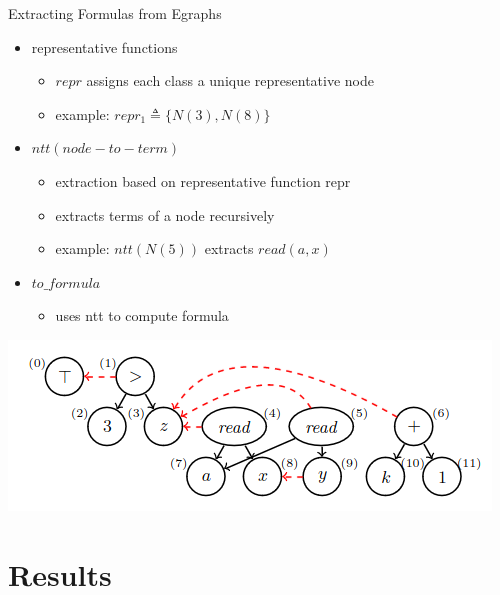 \documentclass{beamer}
\begin{document}
\begin{frame}{Extracting Formulas from Egraphs}
    \begin{itemize}
        \item representative functions
        \begin{itemize}
            \item $repr$ assigns each class a unique representative node
            \item example: $repr_1 \triangleq \{ N(3), N(8) \}$
        \end{itemize}
        \item \textbf{$ntt (node-to-term)$}
        \begin{itemize}
            \item extraction based on representative function repr
            \item extracts terms of a node recursively
            \item example: $ntt(N(5))$ extracts $read(a,x)$
        \end{itemize}
        \item \textbf{$to\_formula$}
        \begin{itemize}
            \item uses ntt to compute formula
        \end{itemize}
    \end{itemize}
    \begin{center}
    \includegraphics[scale=0.5]{FMI1.png}
    \end{center}
\end{frame}


\section{Results}
\end{document}

